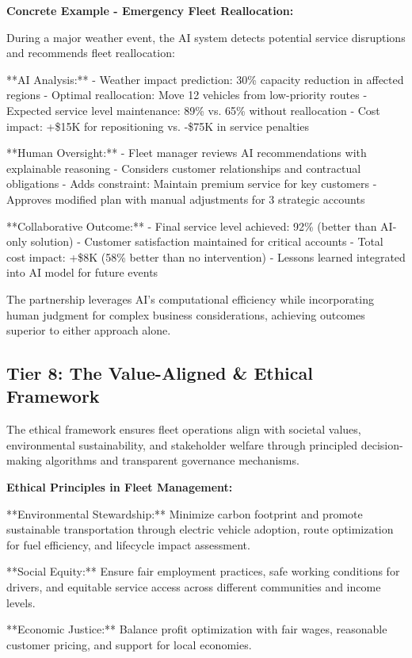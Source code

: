 \documentclass{article}
\begin{document}
\textbf{Concrete Example - Emergency Fleet Reallocation:}

During a major weather event, the AI system detects potential service disruptions and recommends fleet reallocation:

**AI Analysis:**
- Weather impact prediction: 30\% capacity reduction in affected regions
- Optimal reallocation: Move 12 vehicles from low-priority routes
- Expected service level maintenance: 89\% vs. 65\% without reallocation
- Cost impact: +\$15K for repositioning vs. -\$75K in service penalties

**Human Oversight:**
- Fleet manager reviews AI recommendations with explainable reasoning
- Considers customer relationships and contractual obligations
- Adds constraint: Maintain premium service for key customers
- Approves modified plan with manual adjustments for 3 strategic accounts

**Collaborative Outcome:**
- Final service level achieved: 92\% (better than AI-only solution)
- Customer satisfaction maintained for critical accounts
- Total cost impact: +\$8K (58\% better than no intervention)
- Lessons learned integrated into AI model for future events

The partnership leverages AI's computational efficiency while incorporating human judgment for complex business considerations, achieving outcomes superior to either approach alone.

\subsection{Tier 8: The Value-Aligned \& Ethical Framework}

The ethical framework ensures fleet operations align with societal values, environmental sustainability, and stakeholder welfare through principled decision-making algorithms and transparent governance mechanisms.

\textbf{Ethical Principles in Fleet Management:}

**Environmental Stewardship:** Minimize carbon footprint and promote sustainable transportation through electric vehicle adoption, route optimization for fuel efficiency, and lifecycle impact assessment.

**Social Equity:** Ensure fair employment practices, safe working conditions for drivers, and equitable service access across different communities and income levels.

**Economic Justice:** Balance profit optimization with fair wages, reasonable customer pricing, and support for local economies.
\end{document}

